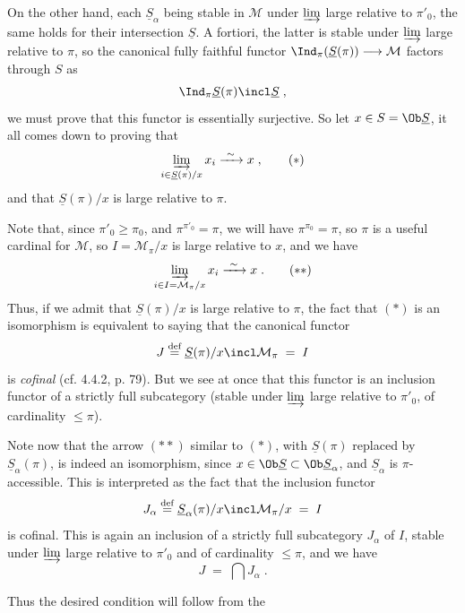
On the other hand, each $\underline{S}_\alpha$ being stable in $\mathcal{M}$ under $\varinjlim$ large relative to $\pi'_0$, the same holds for their intersection $\underline{S}$. A fortiori, the latter is stable under $\varinjlim$ large relative to $\pi$, so the canonical fully faithful functor $\Ind_\pi(\underline{S}(\pi))\longrightarrow\mathcal{M}$ factors through $S$ as
\[ \Ind_\pi\underline{S}(\pi) \incl \underline{S} \; , \]
we must prove that this functor is essentially surjective. So let $x\in S=\Ob\underline{S}$, it all comes down to proving that
\[ \varinjlim_{i\in\underline{S}(\pi)/x} x_i \xrightarrow{\ \sim\ } x \; , \tag*{$(*)$} \]
and that $\underline{S}(\pi)/x$ is large relative to $\pi$.

Note that, since $\pi'_0\geqslant\pi_0$, and $\pi^{\pi'_0}=\pi$, we will have $\pi^{\pi_0}=\pi$, so $\pi$ is a useful cardinal for $\mathcal{M}$, so $I=\mathcal{M}_\pi/x$ is large relative to $x$, and we have %
\[ \varinjlim_{i\in I=\mathcal{M}_\pi/x} x_i \xrightarrow{\ \sim\ } x \; . \tag*{$(**)$} \]
Thus, if we admit that $\underline{S}(\pi)/x$ is large relative to $\pi$,
the fact that $(*)$ is an isomorphism is equivalent to saying that the canonical functor
\[ J \overset{\text{def}}{=} \underline{S}(\pi)/x \incl \mathcal{M}_\pi \; = \; I \] %
is \textit{cofinal} (cf. 4.4.2, p. 79). But we see at once that this functor is an inclusion functor of a strictly full subcategory (stable under $\varinjlim$ large relative to $\pi'_0$, of cardinality $\leqslant\pi$).

Note now that the arrow $(**)$ similar to $(*)$, with $\underline{S}(\pi)$ replaced by $\underline{S}_\alpha(\pi)$, is indeed an isomorphism, since $x\in\Ob\underline{S}\subset\Ob\underline{S}_\alpha$, and $\underline{S}_\alpha$ is $\pi$-accessible. This is interpreted as the fact that the inclusion functor
\[ J_\alpha \overset{\text{def}}{=} \underline{S}_\alpha(\pi)/x \incl \mathcal{M}_\pi/x \; = \; I \]
is cofinal. This is again an inclusion of a strictly full subcategory $J_\alpha$ of $I$, stable under $\varinjlim$ large relative to $\pi'_0$ and of cardinality $\leqslant\pi$, and we have
\[ J \; = \; \bigcap J_\alpha \; . \]

Thus the desired condition will follow from the

